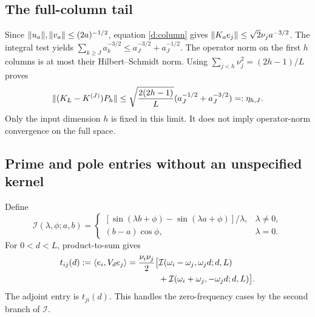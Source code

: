 \subsection{The full-column tail}
Since $\lVert u_a\rVert,\lVert v_a\rVert\le(2a)^{-1/2}$, equation \eqref{d:column}
gives $\lVert K_ae_j\rVert\le\sqrt2\nu_ja^{-3/2}$.
The integral test yields
$\sum_{k\ge J}a_k^{-3/2}\le a_J^{-3/2}+a_J^{-1/2}$.
The operator norm on the first $h$ columns is at most their Hilbert--Schmidt
norm. Using $\sum_{j<h}\nu_j^2=(2h-1)/L$ proves
\begin{equation}\label{d:column-tail}
\lVert (K_L-K^{(J)})P_h\rVert\le
\sqrt{\frac{2(2h-1)}L}(a_J^{-1/2}+a_J^{-3/2})=:\eta_{h,J}.
\end{equation}
Only the input dimension $h$ is fixed in this limit. It does not imply
operator-norm convergence on the full space.

\subsection{Prime and pole entries without an unspecified kernel}
Define
\[
\mathcal I(\lambda,\phi;a,b)=
\begin{cases}
[\sin(\lambda b+\phi)-\sin(\lambda a+\phi)]/\lambda,&\lambda\ne0,\\
(b-a)\cos\phi,&\lambda=0.
\end{cases}
\]
For $0<d<L$, product-to-sum gives
\begin{align}
t_{ij}(d):=\langle e_i,V_de_j\rangle
=\frac{\nu_i\nu_j}{2}\bigl[&\mathcal I(\omega_i-\omega_j,\omega_jd;d,L)\notag\\
&+\mathcal I(\omega_i+\omega_j,-\omega_jd;d,L)\bigr].
\label{d:shift-entries}
\end{align}
The adjoint entry is $t_{ji}(d)$. This handles the zero-frequency cases
by the second branch of $\mathcal I$.

